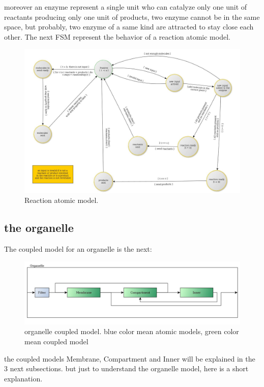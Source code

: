 \documentclass[12pt]{article}
\begin{document}
moreover an enzyme represent a single unit who can catalyze only one unit of reactants producing only one unit of products, two enzyme cannot be in the same space, but probably, two enzyme of a same kind are attracted to stay close each other.
The next FSM represent the behavior of a reaction atomic model.

\begin{figure}[h!]
 \centering
  \includegraphics[width=1\textwidth]{atomic-reaction.jpg}
 \caption{Reaction atomic model.}
\end{figure}

\subsection*{the organelle}

The coupled model for an organelle is the next:

\begin{figure}[h!]
 \centering
  \includegraphics[width=1\textwidth]{coupled-organelle.jpg}
 \caption{organelle coupled model. blue color mean atomic models, green color mean coupled model}
\end{figure}

the coupled models Membrane, Compartment and Inner will be explained in the 3 next subsections. but just to understand the organelle model, here is a short explanation.
\end{document}
